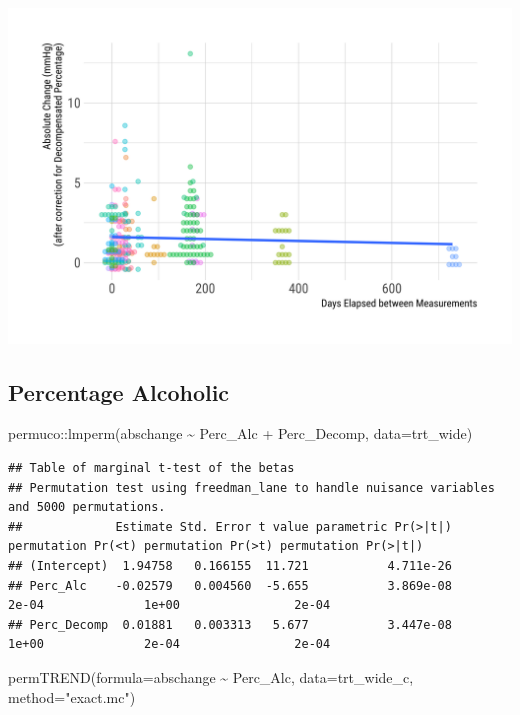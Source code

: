 \documentclass[
]{article}
\newenvironment{Shaded}{\begin{snugshade}}{\end{snugshade}}
\newcommand{\AttributeTok}[1]{\textcolor[rgb]{0.77,0.63,0.00}{#1}}
\newcommand{\FunctionTok}[1]{\textcolor[rgb]{0.00,0.00,0.00}{#1}}
\newcommand{\NormalTok}[1]{#1}
\newcommand{\SpecialCharTok}[1]{\textcolor[rgb]{0.00,0.00,0.00}{#1}}
\newcommand{\StringTok}[1]{\textcolor[rgb]{0.31,0.60,0.02}{#1}}
\begin{document}
\includegraphics{figures/unnamed-chunk-36-1.png}

\hypertarget{percentage-alcoholic}{%
\subsection{Percentage Alcoholic}\label{percentage-alcoholic}}

\begin{Shaded}
\begin{Highlighting}[]
\NormalTok{permuco}\SpecialCharTok{::}\FunctionTok{lmperm}\NormalTok{(abschange }\SpecialCharTok{\textasciitilde{}}\NormalTok{ Perc\_Alc }\SpecialCharTok{+}\NormalTok{ Perc\_Decomp, }\AttributeTok{data=}\NormalTok{trt\_wide)}
\end{Highlighting}
\end{Shaded}

\begin{verbatim}
## Table of marginal t-test of the betas
## Permutation test using freedman_lane to handle nuisance variables and 5000 permutations.
##             Estimate Std. Error t value parametric Pr(>|t|) permutation Pr(<t) permutation Pr(>t) permutation Pr(>|t|)
## (Intercept)  1.94758   0.166155  11.721           4.711e-26                                                           
## Perc_Alc    -0.02579   0.004560  -5.655           3.869e-08              2e-04              1e+00                2e-04
## Perc_Decomp  0.01881   0.003313   5.677           3.447e-08              1e+00              2e-04                2e-04
\end{verbatim}

\begin{Shaded}
\begin{Highlighting}[]
\FunctionTok{permTREND}\NormalTok{(}\AttributeTok{formula=}\NormalTok{abschange }\SpecialCharTok{\textasciitilde{}}\NormalTok{ Perc\_Alc, }\AttributeTok{data=}\NormalTok{trt\_wide\_c,}
          \AttributeTok{method=}\StringTok{"exact.mc"}\NormalTok{)}
\end{Highlighting}
\end{Shaded}
\end{document}
